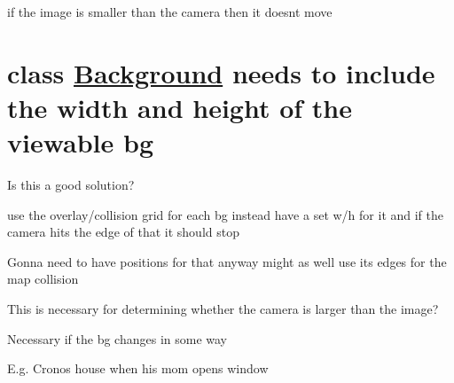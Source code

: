 
\begin{DoxyItemize}
\item if the image is smaller than the camera then it doesn\textquotesingle{}t move
\end{DoxyItemize}

\section*{class \hyperlink{classBackground}{Background} needs to include the width and height of the viewable bg}


\begin{DoxyItemize}
\item Is this a good solution?
\begin{DoxyItemize}
\item use the overlay/collision grid for each bg instead have a set w/h for it and if the camera hits the edge of that it should stop
\item Gonna need to have positions for that anyway might as well use it\textquotesingle{}s edges for the map collision
\end{DoxyItemize}
\item This is necessary for determining whether the camera is larger than the image?
\item Necessary if the bg changes in some way
\begin{DoxyItemize}
\item E.\+g. Crono\textquotesingle{}s house when his mom opens window 
\end{DoxyItemize}
\end{DoxyItemize}